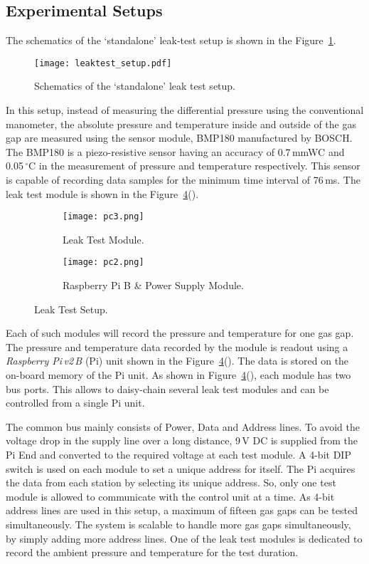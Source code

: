 \subsection{Experimental Setups}
The schematics of the `standalone' leak-test setup is shown in the
Figure~\ref{fig:schematics}. 
\begin{figure}
  \centering
  \texttt{[image: leaktest\_setup.pdf]}
  \caption{Schematics of the `standalone' leak test setup.}
  \label{fig:schematics}
\end{figure}
In this setup, instead of measuring the differential pressure using the
conventional manometer, the absolute pressure and temperature inside and
outside of the gas gap are measured using the sensor module, BMP180
manufactured by BOSCH\cite{bmp180}. The BMP180 is a piezo-resistive sensor
having an accuracy of 0.7\,mmWC and 0.05\,$^{\circ}$C in the measurement of
pressure and temperature respectively. This sensor is capable of recording
data samples for the minimum time interval of 76\,ms. The leak test module is
shown in the Figure~\ref{fig:setup}(). 
\begin{figure}
  \centering
  \begin{subfigure}[b]{0.34\textwidth}
    \texttt{[image: pc3.png]}
    \caption{Leak Test Module.}
    \label{fig:pc3}
  \end{subfigure}
  \begin{subfigure}[b]{0.64\textwidth}
    \texttt{[image: pc2.png]}
    \caption{Raspberry Pi B \& Power Supply Module.}
    \label{fig:pc2}
  \end{subfigure}
  \caption{Leak Test Setup.}
  \label{fig:setup}
\end{figure}
Each of such modules will record the pressure and temperature for one gas gap.
The pressure and temperature data recorded by the module is readout using a
\textit{Raspberry Pi\,v2\,B} (Pi) unit\cite{rpi} shown in the
Figure~\ref{fig:setup}(). The data is stored on the on-board
memory of the Pi unit. As shown in Figure~\ref{fig:setup}(),
each module has two bus ports. This allows to daisy-chain several leak test
modules and can be controlled from a single Pi unit.

The common bus mainly consists of Power, Data and Address lines. To avoid the
voltage drop in the supply line over a long distance, 9\,V DC is supplied from
the Pi End and converted to the required voltage at each test module. A 4-bit
DIP switch is used on each module to set a unique address for itself. The Pi
acquires the data from each station by selecting its unique address. So, only
one test module is allowed to communicate with the control unit at a time.
As 4-bit address lines are used in this setup, a maximum of fifteen gas gaps
can be tested simultaneously. The system is scalable to handle more gas gaps
simultaneously, by simply adding more address lines. One of the leak test
modules is dedicated to record the ambient pressure and temperature for the
test duration.

